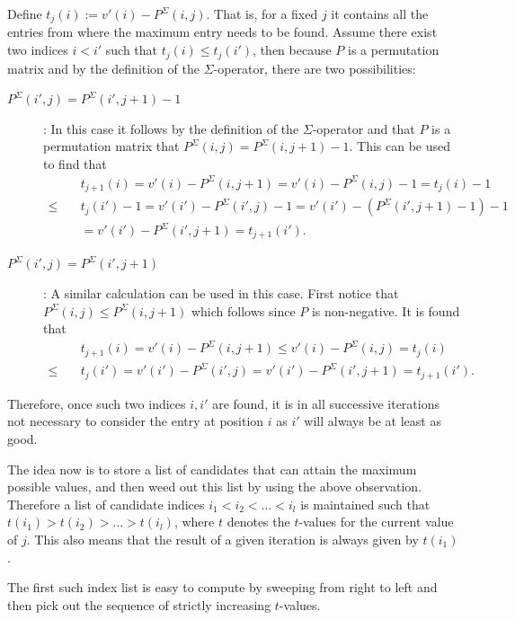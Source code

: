 \documentclass[twoside,11pt,openright]{report}
\begin{document}
Define $t_j(i) := v'(i) - P^{\Sigma}(i, j)$. That is, for a fixed $j$ it contains all the entries from where the maximum entry needs to be found. Assume there exist two indices $i < i'$ such that $t_j(i) \leq t_j(i')$, then because $P$ is a permutation matrix and by the definition of the $\Sigma$-operator, there are two possibilities:
\begin{description}
  \item[$P^{\Sigma}(i', j) = P^{\Sigma}(i', j + 1) - 1$]: In this case it follows by the definition of the $\Sigma$-operator and that $P$ is a permutation matrix that $P^{\Sigma}(i, j) = P^{\Sigma}(i, j + 1) - 1$.  This can be used to find that
  \begin{align*}
    &t_{j + 1}(i) = v'(i) - P^{\Sigma}(i, j + 1) = v'(i) - P^{\Sigma}(i, j) - 1
      = t_{j}(i) - 1 \\
      \leq\quad &t_j(i') - 1 = v'(i') - P^{\Sigma}(i', j) - 1
      = v'(i') - (P^{\Sigma}(i', j + 1) - 1) - 1 \\
      &= v'(i') - P^{\Sigma}(i', j + 1) = t_{j + 1}(i').
  \end{align*}

  \item[$P^{\Sigma}(i', j) = P^{\Sigma}(i', j + 1)$]: A similar calculation can be used in this case. First notice that $P^{\Sigma}(i, j) \leq P^{\Sigma}(i, j + 1)$ which follows since $P$ is non-negative. It is found that
  \begin{align*}
    &t_{j + 1}(i) = v'(i) - P^{\Sigma}(i, j + 1) \leq v'(i) - P^{\Sigma}(i, j) = t_{j}(i) \\
      \leq\quad &t_j(i') = v'(i') - P^{\Sigma}(i', j) = v'(i') - P^{\Sigma}(i', j + 1) = t_{j + 1}(i').
  \end{align*}
\end{description}
%
Therefore, once such two indices $i,i'$ are found, it is in all successive iterations not necessary to consider the entry at position $i$ as $i'$ will always be at least as good.

The idea now is to store a list of candidates that can attain the maximum possible values, and then weed out this list by using the above observation. Therefore a list of candidate indices $i_1 < i_2 < \dots < i_l$ is maintained such that $t(i_1) > t(i_2) > \dots > t(i_l)$, where $t$ denotes the $t$-values for the current value of $j$. This also means that the result of a given iteration is always given by $t(i_1)$.

The first such index list is easy to compute by sweeping from right to left and then pick out the sequence of strictly increasing $t$-values.
\end{document}
